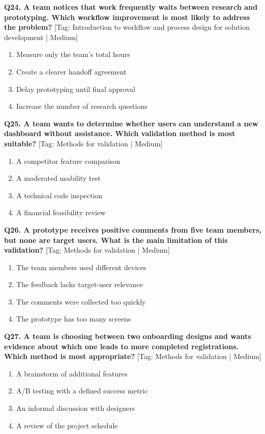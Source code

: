 \noindent\textbf{Q24. A team notices that work frequently waits between research and prototyping. Which workflow improvement is most likely to address the problem?} \hfill [Tag: Introduction to workflow and process design for solution development | Medium]
\begin{enumerate}[label=(\alph*),topsep=2pt,itemsep=1pt,partopsep=0pt,parsep=0pt]
    \item {Measure only the team's total hours}
    \item {Create a clearer handoff agreement}
    \item {Delay prototyping until final approval}
    \item {Increase the number of research questions}
\end{enumerate}
\vspace{2mm}

\noindent\textbf{Q25. A team wants to determine whether users can understand a new dashboard without assistance. Which validation method is most suitable?} \hfill [Tag: Methods for validation | Medium]
\begin{enumerate}[label=(\alph*),topsep=2pt,itemsep=1pt,partopsep=0pt,parsep=0pt]
    \item {A competitor feature comparison}
    \item {A moderated usability test}
    \item {A technical code inspection}
    \item {A financial feasibility review}
\end{enumerate}
\vspace{2mm}

\noindent\textbf{Q26. A prototype receives positive comments from five team members, but none are target users. What is the main limitation of this validation?} \hfill [Tag: Methods for validation | Medium]
\begin{enumerate}[label=(\alph*),topsep=2pt,itemsep=1pt,partopsep=0pt,parsep=0pt]
    \item {The team members used different devices}
    \item {The feedback lacks target-user relevance}
    \item {The comments were collected too quickly}
    \item {The prototype has too many screens}
\end{enumerate}
\vspace{2mm}

\noindent\textbf{Q27. A team is choosing between two onboarding designs and wants evidence about which one leads to more completed registrations. Which method is most appropriate?} \hfill [Tag: Methods for validation | Medium]
\begin{enumerate}[label=(\alph*),topsep=2pt,itemsep=1pt,partopsep=0pt,parsep=0pt]
    \item {A brainstorm of additional features}
    \item {A/B testing with a defined success metric}
    \item {An informal discussion with designers}
    \item {A review of the project schedule}
\end{enumerate}
\vspace{2mm}

